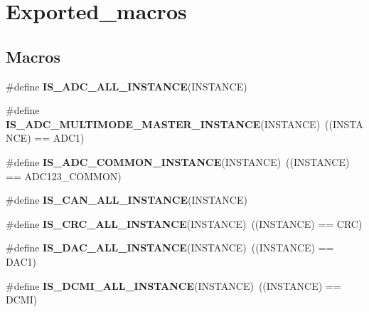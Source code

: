 \hypertarget{group___exported__macros}{}\section{Exported\+\_\+macros}
\label{group___exported__macros}
\subsection*{Macros}
\begin{DoxyCompactItemize}
\item 
\#define {\bfseries I\+S\+\_\+\+A\+D\+C\+\_\+\+A\+L\+L\+\_\+\+I\+N\+S\+T\+A\+N\+CE}(I\+N\+S\+T\+A\+N\+CE)
\item 
\mbox{\label{group___exported__macros_ga26b4e299ac54d09082645a70f889c143}} 
\#define {\bfseries I\+S\+\_\+\+A\+D\+C\+\_\+\+M\+U\+L\+T\+I\+M\+O\+D\+E\+\_\+\+M\+A\+S\+T\+E\+R\+\_\+\+I\+N\+S\+T\+A\+N\+CE}(I\+N\+S\+T\+A\+N\+CE)~((I\+N\+S\+T\+A\+N\+CE) == A\+D\+C1)
\item 
\mbox{\label{group___exported__macros_gad8a5831c786b6b265531b890a194cbe2}} 
\#define {\bfseries I\+S\+\_\+\+A\+D\+C\+\_\+\+C\+O\+M\+M\+O\+N\+\_\+\+I\+N\+S\+T\+A\+N\+CE}(I\+N\+S\+T\+A\+N\+CE)~((I\+N\+S\+T\+A\+N\+CE) == A\+D\+C123\+\_\+\+C\+O\+M\+M\+ON)
\item 
\#define {\bfseries I\+S\+\_\+\+C\+A\+N\+\_\+\+A\+L\+L\+\_\+\+I\+N\+S\+T\+A\+N\+CE}(I\+N\+S\+T\+A\+N\+CE)
\item 
\mbox{\label{group___exported__macros_gaa514941a7f02f65eb27450c05e4e8dd1}} 
\#define {\bfseries I\+S\+\_\+\+C\+R\+C\+\_\+\+A\+L\+L\+\_\+\+I\+N\+S\+T\+A\+N\+CE}(I\+N\+S\+T\+A\+N\+CE)~((I\+N\+S\+T\+A\+N\+CE) == C\+RC)
\item 
\mbox{\label{group___exported__macros_ga94426b97cc5f1644d67f291cbcdba6d8}} 
\#define {\bfseries I\+S\+\_\+\+D\+A\+C\+\_\+\+A\+L\+L\+\_\+\+I\+N\+S\+T\+A\+N\+CE}(I\+N\+S\+T\+A\+N\+CE)~((I\+N\+S\+T\+A\+N\+CE) == D\+A\+C1)
\item 
\mbox{\label{group___exported__macros_gaca27f42a2f7dd5715c74884bd9af310d}} 
\#define {\bfseries I\+S\+\_\+\+D\+C\+M\+I\+\_\+\+A\+L\+L\+\_\+\+I\+N\+S\+T\+A\+N\+CE}(I\+N\+S\+T\+A\+N\+CE)~((I\+N\+S\+T\+A\+N\+CE) == D\+C\+MI)

\end{DoxyCompactItemize}
